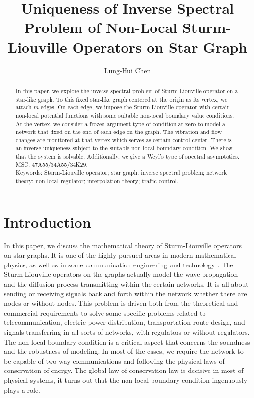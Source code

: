 \documentclass[10pt,a4paper]{article}
\theoremstyle{plain}
\theoremstyle{definition}
\theoremstyle{remark}
\numberwithin{equation}{section}
\begin{document}
\title{Uniqueness of Inverse Spectral Problem of Non-Local Sturm-Liouville Operators on Star Graph}
\author[1]{Lung-Hui Chen}
\maketitle
\begin{abstract}
In this paper, we explore the inverse spectral problem of Sturm-Liouville operator on a star-like graph. To this fixed star-like graph centered at the origin as its vertex, we attach $m$ edges. On each edge, we impose the Sturm-Liouville operator with certain non-local potential functions with some suitable non-local boundary value conditions. At the vertex, we consider a frozen argument type of condition at zero to model a network that fixed on the end of each edge on the graph. The vibration and flow changes are monitored at that vertex which serves as certain control center.  There is an inverse uniqueness subject to the suitable non-local boundary condition. We show that the system is solvable. Additionally, we give a Weyl's type of spectral asymptotics.
\\MSC: 47A55/34A55/34K29.
\\Keywords:  Sturm-Liouville operator; star graph; inverse spectral problem; network theory; non-local regulator; interpolation theory; traffic control.
\end{abstract}
\section{Introduction}
In this paper, we discuss the mathematical theory of Sturm-Liouville operators on star graphs. It is one of the highly-pursued areas in modern mathematical physics, as well as in some communication engineering and technology \cite{Freiling,Kostrykin,Kuchment,Novikov,Pokornyi,Shieh}. The Sturm-Liouville operators on the graphs actually model the wave propagation and the diffusion process transmitting within the certain networks. It is all about sending or receiving signals back and forth within the network whether there are nodes or without nodes. This problem is driven both from the theoretical and commercial requirements to solve some specific problems related to telecommunication, electric power distribution, transportation route design, and signals transferring in all sorts of networks, with regulators or without regulators. The non-local boundary condition is a critical aspect that concerns the soundness and the robustness of modeling. In most of the cases, we require the network to be capable of two-way communications and following the physical laws of conservation of energy. The global law of conservation law is decisive in most of physical systems, it turns out that the non-local boundary condition ingenuously plays a role.
\end{document}
